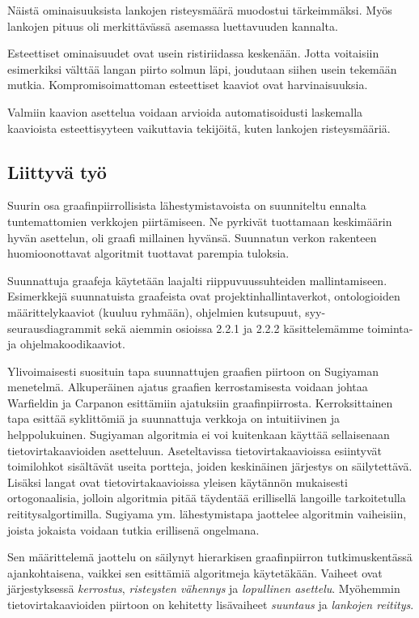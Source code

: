 \documentclass[finnish,12pt]{article}
\begin{document}
Näistä ominaisuuksista lankojen risteysmäärä muodostui tärkeimmäksi. Myös lankojen pituus oli merkittävässä asemassa luettavuuden kannalta.

Esteettiset ominaisuudet ovat usein ristiriidassa keskenään.
Jotta voitaisiin esimerkiksi välttää langan piirto solmun läpi, joudutaan siihen usein tekemään mutkia.
Kompromisoimattoman esteettiset kaaviot ovat harvinaisuuksia.

Valmiin kaavion asettelua voidaan arvioida automatisoidusti laskemalla kaavioista esteettisyyteen vaikuttavia tekijöitä, kuten lankojen risteysmääriä.


	\subsection{Liittyvä työ}

Suurin osa graafinpiirrollisista lähestymistavoista on suunniteltu ennalta tuntemattomien verkkojen piirtämiseen.
Ne pyrkivät tuottamaan keskimäärin hyvän asettelun, oli graafi millainen hyvänsä.
Suunnatun verkon rakenteen huomioonottavat algoritmit tuottavat parempia tuloksia.

Suunnattuja graafeja käytetään laajalti riippuvuussuhteiden mallintamiseen.
Esimerkkejä suunnatuista graafeista ovat projektinhallintaverkot, ontologioiden määrittelykaaviot (kuuluu ryhmään), ohjelmien kutsupuut, syy-seurausdiagrammit sekä aiemmin osioissa 2.2.1 ja 2.2.2 käsittelemämme toiminta- ja ohjelmakoodikaaviot.

Ylivoimaisesti suosituin tapa suunnattujen graafien piirtoon on Sugiyaman menetelmä. \cite{RefWorks:9}
Alkuperäinen ajatus graafien kerrostamisesta voidaan johtaa Warfieldin \cite{RefWorks:58} ja Carpanon \cite{RefWorks:57} esittämiin ajatuksiin graafinpiirrosta.
Kerroksittainen tapa esittää syklittömiä ja suunnattuja verkkoja on intuitiivinen ja helppolukuinen.
Sugiyaman algoritmia ei voi kuitenkaan käyttää sellaisenaan tietovirtakaavioiden asetteluun.
Aseteltavissa tietovirtakaavioissa esiintyvät toimilohkot sisältävät useita portteja, joiden keskinäinen järjestys on säilytettävä.
Lisäksi langat ovat tietovirtakaavioissa yleisen käytännön mukaisesti ortogonaalisia, jolloin algoritmia pitää täydentää erillisellä langoille tarkoitetulla reititysalgortimilla.
Sugiyama ym. lähestymistapa jaottelee algoritmin vaiheisiin, joista jokaista voidaan tutkia erillisenä ongelmana.

Sen määrittelemä jaottelu on säilynyt hierarkisen graafinpiirron tutkimuskentässä ajankohtaisena, vaikkei sen esittämiä algoritmeja käytetäkään.
Vaiheet ovat järjestyksessä \emph{kerrostus}, \emph{risteysten vähennys} ja \emph{lopullinen asettelu}.
Myöhemmin tietovirtakaavioiden piirtoon on kehitetty lisävaiheet \emph{suuntaus} ja  \emph{lankojen reititys}.
\end{document}
